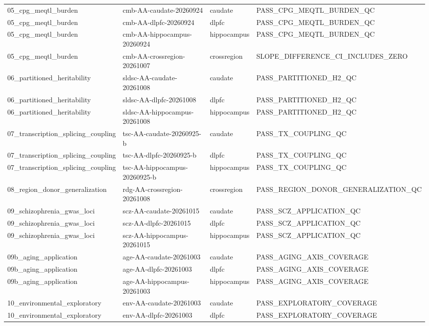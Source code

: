 \begin{tabular}{llll}
05\_cpg\_meqtl\_burden & cmb-AA-caudate-20260924 & caudate & PASS\_CPG\_MEQTL\_BURDEN\_QC \\
05\_cpg\_meqtl\_burden & cmb-AA-dlpfc-20260924 & dlpfc & PASS\_CPG\_MEQTL\_BURDEN\_QC \\
05\_cpg\_meqtl\_burden & cmb-AA-hippocampus-20260924 & hippocampus & PASS\_CPG\_MEQTL\_BURDEN\_QC \\
05\_cpg\_meqtl\_burden & cmb-AA-crossregion-20261007 & crossregion & SLOPE\_DIFFERENCE\_CI\_INCLUDES\_ZERO \\
06\_partitioned\_heritability & sldsc-AA-caudate-20261008 & caudate & PASS\_PARTITIONED\_H2\_QC \\
06\_partitioned\_heritability & sldsc-AA-dlpfc-20261008 & dlpfc & PASS\_PARTITIONED\_H2\_QC \\
06\_partitioned\_heritability & sldsc-AA-hippocampus-20261008 & hippocampus & PASS\_PARTITIONED\_H2\_QC \\
07\_transcription\_splicing\_coupling & tsc-AA-caudate-20260925-b & caudate & PASS\_TX\_COUPLING\_QC \\
07\_transcription\_splicing\_coupling & tsc-AA-dlpfc-20260925-b & dlpfc & PASS\_TX\_COUPLING\_QC \\
07\_transcription\_splicing\_coupling & tsc-AA-hippocampus-20260925-b & hippocampus & PASS\_TX\_COUPLING\_QC \\
08\_region\_donor\_generalization & rdg-AA-crossregion-20261008 & crossregion & PASS\_REGION\_DONOR\_GENERALIZATION\_QC \\
09\_schizophrenia\_gwas\_loci & scz-AA-caudate-20261015 & caudate & PASS\_SCZ\_APPLICATION\_QC \\
09\_schizophrenia\_gwas\_loci & scz-AA-dlpfc-20261015 & dlpfc & PASS\_SCZ\_APPLICATION\_QC \\
09\_schizophrenia\_gwas\_loci & scz-AA-hippocampus-20261015 & hippocampus & PASS\_SCZ\_APPLICATION\_QC \\
09b\_aging\_application & age-AA-caudate-20261003 & caudate & PASS\_AGING\_AXIS\_COVERAGE \\
09b\_aging\_application & age-AA-dlpfc-20261003 & dlpfc & PASS\_AGING\_AXIS\_COVERAGE \\
09b\_aging\_application & age-AA-hippocampus-20261003 & hippocampus & PASS\_AGING\_AXIS\_COVERAGE \\
10\_environmental\_exploratory & env-AA-caudate-20261003 & caudate & PASS\_EXPLORATORY\_COVERAGE \\
10\_environmental\_exploratory & env-AA-dlpfc-20261003 & dlpfc & PASS\_EXPLORATORY\_COVERAGE \\

\end{tabular}
